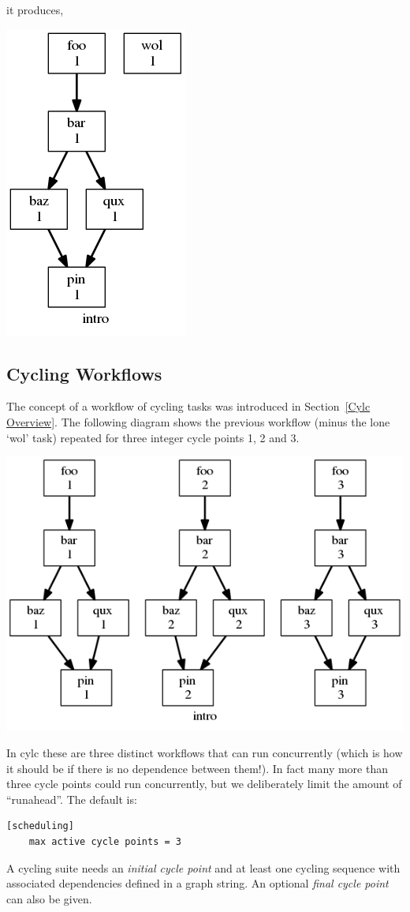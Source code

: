 it produces,

\begin{center}
\includegraphics[width=0.2\columnwidth]{resources/intro-1.png} %
\end{center}

\subsection{Cycling Workflows}

The concept of a workflow of cycling tasks was introduced in Section~\ref{Cylc
Overview}.  The following diagram shows the previous workflow (minus the lone
`wol' task) repeated for three integer cycle points 1, 2 and 3.

\begin{center}
\includegraphics[width=0.5\columnwidth]{resources/intro.png} %
\end{center}

In cylc these are three distinct workflows that can run concurrently (which is
how it should be if there is no dependence between them!). In fact many more
than three cycle points could run concurrently, but we deliberately limit the
amount of ``runahead''. The default is:
\begin{lstlisting}
[scheduling]
    max active cycle points = 3
\end{lstlisting}

A cycling suite needs an {\em initial cycle point} and at least one cycling
sequence with associated dependencies defined in a graph string. An optional
{\em final cycle point} can also be given.


